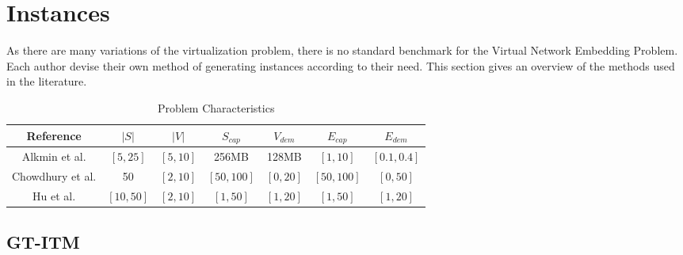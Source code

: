 \section{Instances}
As there are many variations of the virtualization problem, there is no standard benchmark for the Virtual Network Embedding Problem. Each author devise their own method of generating instances according to their need. This section gives an overview of the methods used in the literature.

\begin{table}[h]
\begin{center}
  \small
  \caption{Problem Characteristics}
  \begin{tabular}{c c c c c c c}
    Reference             & $|S|$   & $|V|$    & $S_{cap}$  & $V_{dem}$ & $E_{cap}$   & $E_{dem}$      \\
  \hline
  Alkmin et al.           & $[5,25]$  & $[5,10]$ & 256MB      & 128MB     & $[1,10]$    & $[0.1,0.4]$  \\
  Chowdhury et al.        & 50        & $[2,10]$ & $[50,100]$ & $[0,20]$  & $[50,100]$  & $[0,50]$     \\
  Hu et al. \cite{hu:2013}& $[10,50]$ & $[2,10]$ & $[1,50]$   & $[1,20]$  & $[1,50]$    & $[1,20]$     \\
  \end{tabular}
\end{center}
\end{table}

\subsection{GT-ITM}

